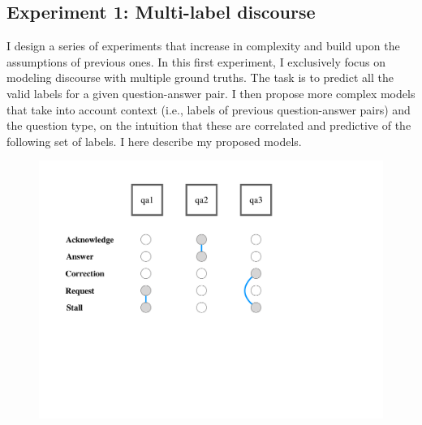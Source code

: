 \subsection{Experiment 1: Multi-label discourse} 
I design a series of experiments that increase in complexity and build upon the assumptions of previous ones. In this first experiment, I exclusively focus on modeling discourse with multiple ground truths. The task is to predict all the valid labels for a given question-answer pair. I then propose more complex models that take into account context (i.e., labels of previous question-answer pairs) and the question type, on the intuition that these are correlated and predictive of the following set of labels. I here describe my proposed models.

\begin{figure}
\RawFloats
\centering
\begin{minipage}{.5\textwidth}
  \centering
  \includegraphics[width=1\linewidth]{plots/multilabel.pdf}
  \label{fig:multilabel}
\end{minipage}%
\hspace*{1.4em}
\begin{minipage}{.5\textwidth}
  \centering
  \vspace{1.3em}

\end{minipage}
\end{figure}
